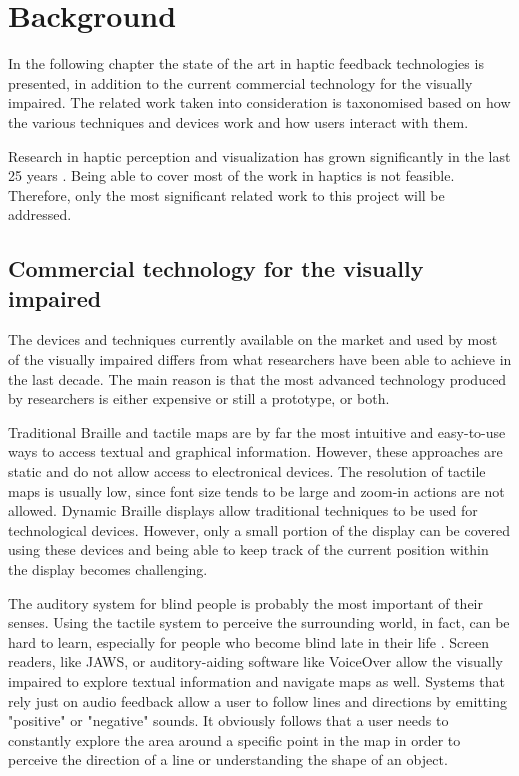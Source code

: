 \chapter{Background}

In the following chapter the state of the art in haptic feedback technologies is presented, in addition to the current commercial technology for the visually impaired. The related work taken into consideration is taxonomised based on how the various techniques and devices work and how users interact with them.

Research in haptic perception and visualization has grown significantly in the last 25 years \cite{roberts2007we}. Being able to cover most of the work in haptics is not feasible. Therefore, only the most significant related work to this project will be addressed.

\section{Commercial technology for the visually impaired}
The devices and techniques currently available on the market and used by most of the visually impaired differs from what researchers have been able to achieve in the last decade. The main reason is that the most advanced technology produced by researchers is either expensive or still a prototype, or both. 

Traditional Braille and tactile maps are by far the most intuitive and easy-to-use ways to access textual and graphical information. However, these approaches are static and do not allow access to electronical devices. The resolution of tactile maps is usually low, since font size tends to be large and zoom-in actions are not allowed. Dynamic Braille displays  allow traditional techniques to be used for technological devices. However, only a small portion of the display can be covered using these devices and being able to keep track of the current position within the display becomes challenging.

The auditory system for blind people is probably the most important of their senses. Using the tactile system to perceive the surrounding world, in fact, can be hard to learn, especially for people who become blind late in their life . Screen readers, like JAWS, or auditory-aiding software like VoiceOver\cite{voiceOver} allow the visually impaired to explore textual information and navigate maps as well. Systems that rely just on audio feedback allow a user to follow lines and directions by emitting "positive" or "negative" sounds. It obviously follows that a user needs to constantly explore the area around a specific point in the map in order to perceive the direction of a line or understanding the shape of an object.    
    

